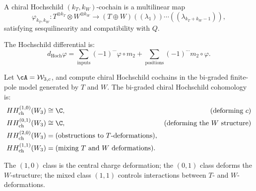 \begin{definition}
A chiral Hochschild $(k_T, k_W)$-cochain is a multilinear map
\begin{equation}
\varphi_{k_T, k_W}: T^{\otimes k_T} \otimes W^{\otimes k_W} \to (T \oplus W)((\lambda_1))\cdots((\lambda_{k_T+k_W-1})),
\end{equation}
satisfying sesquilinearity and compatibility with $Q$.
\end{definition}

The Hochschild differential is:
\begin{equation}
d_{\text{Hoch}} \varphi = \sum_{\text{inputs}} (-1)^{\cdots} \varphi \circ m_2 + \sum_{\text{positions}} (-1)^{\cdots} m_2 \circ \varphi.
\end{equation}

\begin{proposition}
\label{prop:w3-hochschild}
Let\/ $\cA=\mathcal W_{3,c}$, and compute chiral Hochschild cochains
in the bi-graded finite-pole model generated by $T$ and $W$.
The bi-graded chiral Hochschild cohomology is:
\begin{align}
HH^{(1,0)}_{\text{ch}}(W_3) &\cong \C, & \text{(deforming $c$)}\\
HH^{(0,1)}_{\text{ch}}(W_3) &\cong \C, & \text{(deforming the $W$ structure)}\\
HH^{(2,0)}_{\text{ch}}(W_3) &= \text{(obstructions to } T \text{-deformations)},\\
HH^{(1,1)}_{\text{ch}}(W_3) &= \text{(mixing } T \text{ and } W \text{ deformations)}.
\end{align}
\end{proposition}

The $(1,0)$ class is the central charge deformation; the
$(0,1)$ class deforms the $W$-structure; the mixed class
$(1,1)$ controls interactions between $T$- and $W$-deformations.

